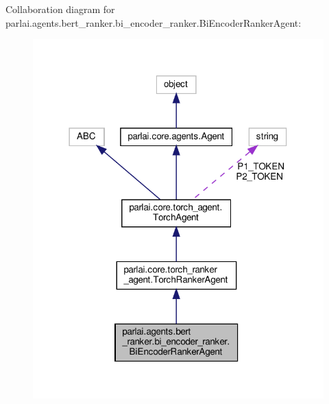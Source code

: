 Collaboration diagram for parlai.\+agents.\+bert\+\_\+ranker.\+bi\+\_\+encoder\+\_\+ranker.\+Bi\+Encoder\+Ranker\+Agent\+:
\nopagebreak
\begin{figure}[H]
\begin{center}
\leavevmode
\includegraphics[width=318pt]{d3/d5a/classparlai_1_1agents_1_1bert__ranker_1_1bi__encoder__ranker_1_1BiEncoderRankerAgent__coll__graph}
\end{center}
\end{figure}
